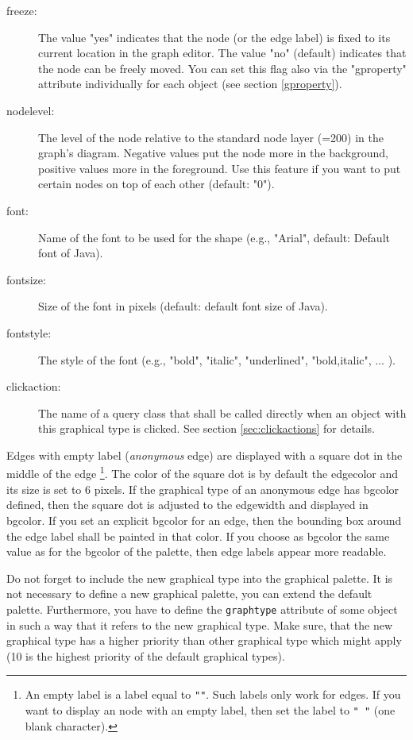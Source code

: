 \begin{description}
\item[freeze:]
    The value "yes" indicates that the node (or the edge label) is fixed to its current location
    in the graph editor. The value "no" (default) indicates that the node can be freely moved.
    You can set this flag also via the "gproperty" attribute individually for each object (see
    section \ref{gproperty}).

\item[nodelevel:]
    The level of the node relative to the standard node layer (=200) in the
    graph's diagram.
    Negative values put the node more in the background, positive values more
    in the foreground. 
    Use this feature if you want to put certain nodes on top of each other
    (default: "0").

\item[font:]
    Name of the font to be used for the shape (e.g., "Arial", default: Default font of Java).

\item[fontsize:]
    Size of the font in pixels (default: default font size of Java).

\item[fontstyle:]
    The style of the font (e.g., "bold", "italic", "underlined", "bold,italic", ... ).

\item[clickaction:]
    The name of a query class that shall be called directly when an object with
    this graphical type is clicked. See section \ref{sec:clickactions} for details.
\end{description}


Edges with empty label ({\em anonymous}\/ edge) are displayed with a square dot in the middle of the edge%
\footnote{An empty label is a label equal to {\tt ""}. Such labels only work for edges.
If you want to display an node with an empty label, then set the label to {\tt " "} (one blank character).}.
The color of the square dot is by default the edgecolor and its size is set to 6 pixels.
If the graphical type of an anonymous edge has bgcolor defined, then the square dot is
adjusted to the edgewidth and displayed in bgcolor. 
If you set an explicit bgcolor for an edge, then the bounding box
around the edge label shall be painted in that color. If you choose as bgcolor
the same value as for the bgcolor of the palette, then edge labels appear
more readable. 

Do not forget to include the new graphical type into the graphical palette.
It is not necessary to define a new graphical palette, you can extend the
default palette. Furthermore, you have to define the {\tt graphtype} attribute
of some object in such a way that it refers to the new graphical type. Make
sure, that the new graphical type has a higher priority than other graphical
type which might apply (10 is the highest priority of the default graphical types).

